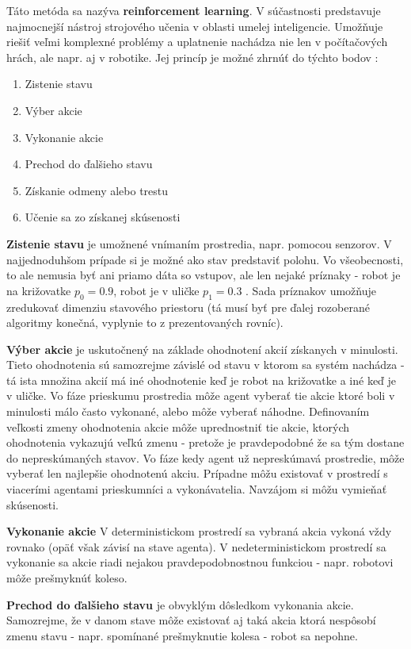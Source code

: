Táto metóda sa nazýva  {\bf reinforcement learning}. V súčastnosti predstavuje
najmocnejší nástroj strojového učenia v oblasti umelej inteligencie. Umožňuje
riešiť veľmi komplexné problémy a uplatnenie nachádza nie len v počítačových
hrách, ale napr. aj v robotike.
Jej princíp je možné zhrnúť do týchto bodov :

\begin{enumerate}
  \item Zistenie stavu
  \item Výber akcie
  \item Vykonanie akcie
  \item Prechod do ďalšieho stavu
  \item Získanie odmeny alebo trestu
  \item Učenie sa zo získanej skúsenosti
\end{enumerate}

 {\bf Zistenie stavu} je umožnené vnímaním prostredia, napr. pomocou senzorov.
V najjednoduhšom prípade si je možné ako stav predstaviť polohu. Vo
všeobecnosti, to ale nemusia byť ani priamo dáta so vstupov, ale len nejaké
príznaky - robot je na križovatke $p_0 = 0.9$, robot je v uličke $p_1 = 0.3$ .
Sada príznakov umožňuje zredukovať dimenziu stavového priestoru (tá musí
byť pre ďalej rozoberané algoritmy konečná, vyplynie to z prezentovaných rovníc).

{\bf Výber akcie} je uskutočnený na základe ohodnotení akcií získanych
v minulosti. Tieto ohodnotenia sú samozrejme závislé od stavu v ktorom sa
systém nachádza - tá ista množina akcií má iné ohodnotenie keď je robot na
križovatke a iné keď je v uličke. Vo fáze prieskumu prostredia môže agent
vyberať tie akcie ktoré boli v minulosti málo často vykonané, alebo môže vyberať náhodne.
Definovaním veľkosti zmeny ohodnotenia akcie môže uprednostniť tie akcie,
ktorých ohodnotenia vykazujú veľkú zmenu - pretože je pravdepodobné že sa
tým dostane do nepreskúmaných stavov.
Vo fáze kedy agent už nepreskúmavá prostredie, môže vyberať len najlepšie ohodnotenú akciu.
Prípadne môžu existovať v prostredí s viacerími agentami prieskumníci a vykonávatelia.
Navzájom si môžu vymieňať skúsenosti.

{\bf Vykonanie akcie} V deterministickom prostredí sa vybraná akcia vykoná vždy rovnako
(opäť však závisí na stave agenta). V nedeterministickom prostredí sa vykonanie
sa akcie riadi nejakou pravdepodobnostnou funkciou - napr. robotovi môže prešmyknúť
koleso.

{\bf Prechod do ďalšieho stavu} je obvyklým dôsledkom vykonania akcie. Samozrejme, že
v danom stave môže existovať aj taká akcia ktorá nespôsobí zmenu stavu - napr. spomínané
prešmyknutie kolesa - robot sa nepohne.

